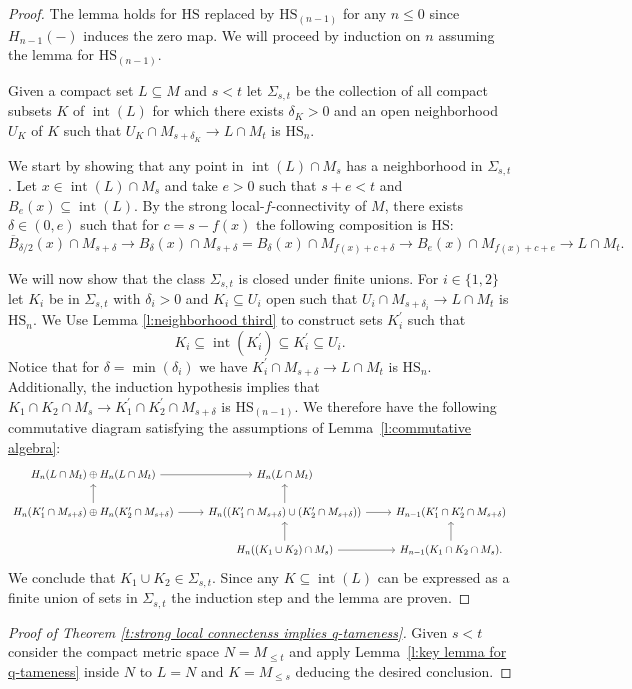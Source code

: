 \documentclass{amsart}
\theoremstyle{definition}
\newcommand{\HS}{\mathrm{HS}}
\DeclareMathOperator{\interior}{int}
\begin{document}
\begin{proof}
	The lemma holds for $\HS$ replaced by $\HS_{(n-1)}$ for any $n \leq 0$ since $H_{n-1}(-)$ induces the zero map. We will proceed by induction on $n$ assuming the lemma for $\HS_{(n-1)}$. 
	
	Given a compact set $L \subseteq M$ and $s < t$ let $\Sigma_{s, t}$ be the collection of all compact subsets $K$ of $\interior(L)$ for which there exists $\delta_K > 0$ and an open neighborhood $U_K$ of $K$ such that $U_K \cap M_{s+\delta_K} \to L \cap M_{t}$ is $\HS_n$.
	
	We start by showing that any point in $\interior(L) \cap M_s$ has a neighborhood in $\Sigma_{s, t}$.
	Let $x \in \interior(L) \cap M_{s}$ and take $e > 0$ such that $s + e < t$ and $B_e(x) \subseteq \interior(L)$.
	By the strong local-$f$-connectivity of $M$, there exists $\delta \in (0, e)$ such that for $c = s - f(x)$ the following composition is $\HS$:
	\begin{equation*}
	\overline B_{\delta/2}(x) \cap M_{s + \delta} \to
	B_\delta(x) \cap M_{s + \delta} =
	B_\delta(x) \cap M_{f(x) + c + \delta} \to
	B_e(x) \cap M_{f(x) + c + e} \to
	L \cap M_{t}.
	\end{equation*}  
	
	We will now show that the class $\Sigma_{s,t}$ is closed under finite unions.
	For $i \in \{1, 2\}$ let $K_i$ be in $\Sigma_{s,t}$ with $\delta_i > 0$ and $K_i \subseteq U_i$ open such that $U_{i} \cap M_{s+\delta_i} \to L \cap M_{t}$ is $\HS_n$.
	We Use Lemma \ref{l:neighborhood third} to construct sets $K_i^\prime$ such that
	\begin{equation*}
	K_i \subseteq \interior(K_i^\prime) \subseteq K_i^\prime \subseteq U_i.
	\end{equation*}
	Notice that for $\delta = \min(\delta_i)$ we have $K_i^\prime \cap M_{s+\delta} \to L \cap M_t$ is $\HS_n$.
	Additionally, the induction hypothesis implies that $K_1 \cap K_2 \cap M_s \to K_1^\prime \cap K_2^\prime \cap M_{s+\delta}$ is $\HS_{(n-1)}$.
	We therefore have the following commutative diagram satisfying the assumptions of Lemma~\ref{l:commutative algebra}:
	\begin{equation*}
	\begin{tikzcd}
	H_n(L \cap M_t) \oplus H_n(L \cap M_t) \arrow[r] &
	H_n(L \cap M_t) & \\
	H_{n}(K_1^\prime \cap M_{s+\delta}) \oplus H_n(K_2^\prime \cap M_{s+\delta}) \arrow[r] \arrow[u] & 
	H_{n}((K_1^\prime \cap M_{s+\delta}) \cup (K_2^\prime \cap M_{s+\delta})) \arrow[r] \arrow[u] &
	H_{n-1}(K_1^\prime \cap K_2^\prime \cap M_{s+\delta}) \\ & 
	H_{n}((K_1 \cup K_2) \cap M_s) \arrow[r] \arrow[u] &
	H_{n-1}(K_1 \cap K_2 \cap M_s). \arrow[u]
	\end{tikzcd}
	\end{equation*}
	We conclude that $K_1 \cup K_2 \in \Sigma_{s, t}$.
	Since any $K \subseteq \interior(L)$ can be expressed as a finite union of sets in $\Sigma_{s,t}$ the induction step and the lemma are proven.
\end{proof}

\begin{proof}[Proof of Theorem \ref{t:strong local connectenss implies q-tameness}]
	Given $s < t$ consider the compact metric space $N = M_{\leq t}$ and apply Lemma~\ref{l:key lemma for q-tameness} inside $N$ to $L = N$ and $K = M_{\leq s}$ deducing the desired conclusion.
\end{proof}
\end{document}
